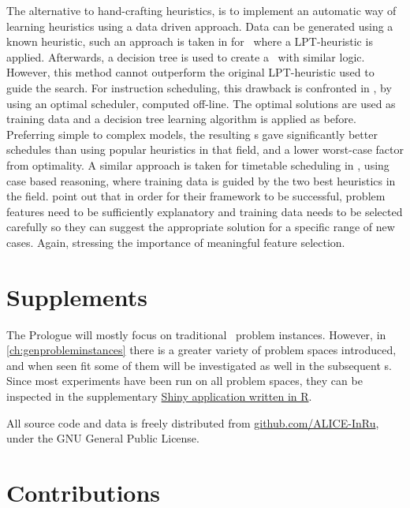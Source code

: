 The alternative to hand-crafting heuristics, is to implement an automatic way of learning heuristics using a data driven approach. %
Data can be generated using a known heuristic, such an approach is taken in 
\cite{Siggi05} for \jsp\, where a LPT-heuristic is applied. Afterwards, a 
decision tree is used to create a \dr\ with similar logic. However, this method 
cannot outperform the original LPT-heuristic used to guide the search. For 
instruction scheduling, this drawback is confronted in 
\citet{Malik08,Russell09,Siggi10}, by using an optimal scheduler, computed 
off-line. The optimal solutions are used as training data and a decision tree 
learning algorithm is applied as before. Preferring simple to complex models, 
the resulting \dr s gave significantly better schedules than using popular 
heuristics in that field, and a lower worst-case factor from optimality. A 
similar approach is taken for timetable scheduling in \cite{Burke06}, using 
case based reasoning, where training data is guided by the two best heuristics 
in the field. 
\citeauthor{Burke06} point out that in order for their framework to be 
successful, problem features need to be sufficiently explanatory and training 
data needs to be selected carefully so they can suggest the appropriate 
solution for a specific range of new cases. 
Again, stressing the importance of meaningful feature selection. 

\section{Supplements}
The Prologue will mostly focus on traditional \jsp\ problem instances. 
However, in \cref{ch:genprobleminstances} there is a greater variety of problem 
spaces introduced, and when seen fit some of them will be investigated as well 
in the subsequent s. 
Since most experiments have been run on all problem spaces, they can be 
inspected in the supplementary \href{http://tgax89.rhi.hi.is:3838/alice}{Shiny 
application written in R}. 

All source code and data is freely distributed from 
\url{github.com/ALICE-InRu}, under the GNU General Public License. 

\section{Contributions}

